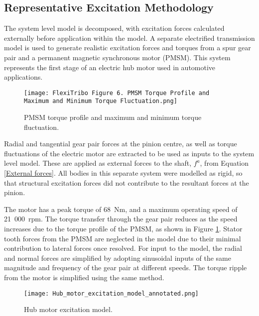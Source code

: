 \subsection{Representative Excitation Methodology}

The system level model is decomposed, with excitation forces calculated externally before application within the model. A separate electrified transmission model is used to generate realistic excitation forces and torques from a spur gear pair and a permanent magnetic synchronous motor (PMSM). This system represents the first stage of an electric hub motor used in automotive applications.

\begin{figure}  
	\texttt{[image: FlexiTribo Figure 6. PMSM Torque Profile and Maximum and Minimum Torque Fluctuation.png]}
	\caption{PMSM torque profile and maximum and minimum torque fluctuation.}
	\label{PMSM torque profile}
\end{figure} 

Radial and tangential gear pair forces at the pinion centre, as well as torque fluctuations of the electric motor are extracted to be used as inputs to the system level model. These are applied as external forces to the shaft, $f^a$, from Equation \ref{External forces}. All bodies in this separate system were modelled as rigid, so that structural excitation forces did not contribute to the resultant forces at the pinion.

The motor has a peak torque of 68~$\mathrm{Nm}$, and a maximum operating speed of 21~000~$\mathrm{rpm}$. The torque transfer through the gear pair reduces as the speed increases due to the torque profile of the PMSM, as shown in Figure \ref{PMSM torque profile}. Stator tooth forces from the PMSM are neglected in the model due to their minimal contribution to lateral forces once resolved. For input to the model, the radial and normal forces are simplified by adopting sinusoidal inputs of the same magnitude and frequency of the gear pair at different speeds. The torque ripple from the motor is simplified using the same method.

\begin{figure}  
	\texttt{[image: Hub\_motor\_excitation\_model\_annotated.png]}
	\caption{Hub motor excitation model.}
	\label{Hub_motor_excitation_model}
\end{figure} 

